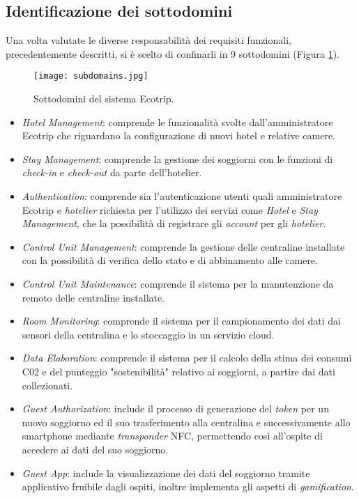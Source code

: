 \subsection{Identificazione dei sottodomini}
Una volta valutate le diverse responsabilità dei requisiti funzionali, precedentemente descritti, si è scelto di confinarli in 9 sottodomini (Figura \ref*{fig:subdomains}).
\begin{figure}[H]
    \texttt{[image: subdomains.jpg]}
    \centering
    \caption[subdomains]{Sottodomini del sistema Ecotrip.}
    \label{fig:subdomains}
\end{figure}
\begin{itemize}
    \item \textit{Hotel Management}: comprende le funzionalità svolte dall'amministratore Ecotrip che riguardano la configurazione di nuovi hotel e relative camere.
    \item \textit{Stay Management}: comprende la gestione dei soggiorni con le funzioni di \textit{check-in} e \textit{check-out} da parte dell'hotelier.
    \item \textit{Authentication}: comprende sia l'autenticazione utenti quali amministratore Ecotrip e \textit{hotelier} richiesta per l'utilizzo dei servizi come \textit{Hotel} e \textit{Stay Management}, che la possibilità di registrare gli \textit{account} per gli \textit{hotelier}.
    \item \textit{Control Unit Management}: comprende la gestione delle centraline installate con la possibilità di verifica dello stato e di abbinamento alle camere.
    \item \textit{Control Unit Maintenance}: comprende il sistema per la manutenzione da remoto delle centraline installate.
    \item \textit{Room Monitoring}: comprende il sistema per il campionamento dei dati dai sensori della centralina e lo stoccaggio in un servizio cloud.
    \item \textit{Data Elaboration}: comprende il sistema per il calcolo della stima dei consumi C02 e del punteggio "sostenibilità" relativo ai soggiorni, a partire dai dati collezionati.
    \item \textit{Guest Authorization}: include il processo di generazione del \textit{token} per un nuovo soggiorno ed il suo trasferimento alla centralina e successivamente allo smartphone mediante \textit{transponder} NFC, permettendo così all'ospite di accedere ai dati del suo soggiorno.
    \item \textit{Guest App}: include la visualizzazione dei dati del soggiorno tramite applicativo fruibile dagli ospiti, inoltre implementa gli aspetti di \textit{gamification}.
\end{itemize}

\newpage